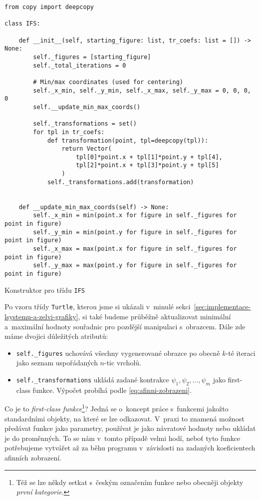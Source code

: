\begin{program}[h]
\begin{lstlisting}[style=python]
from copy import deepcopy

class IFS:

    def __init__(self, starting_figure: list, tr_coefs: list = []) -> None:
        self._figures = [starting_figure]
        self._total_iterations = 0

        # Min/max coordinates (used for centering)
        self._x_min, self._y_min, self._x_max, self._y_max = 0, 0, 0, 0
        self.__update_min_max_coords()

        self._transformations = set()
        for tpl in tr_coefs:
            def transformation(point, tpl=deepcopy(tpl)):
                return Vector(
                    tpl[0]*point.x + tpl[1]*point.y + tpl[4],
                    tpl[2]*point.x + tpl[3]*point.y + tpl[5]
                )
            self._transformations.add(transformation)
    
    
    def __update_min_max_coords(self) -> None:
        self._x_min = min(point.x for figure in self._figures for point in figure)
        self._y_min = min(point.y for figure in self._figures for point in figure)
        self._x_max = max(point.x for figure in self._figures for point in figure)
        self._y_max = max(point.y for figure in self._figures for point in figure)
\end{lstlisting}
    \caption{Konstruktor pro třídu \texttt{IFS}}
    \label{prog:konstruktor-ifs}
\end{program}
Po vzoru třídy \texttt{Turtle}, kterou jsme si ukázali v~minulé sekci~\ref{sec:implementace-lsystemu-a-zelvi-grafiky}, si také budeme průběžně aktualizovat minimální a~maximální hodnoty souřadnic pro pozdější manipulaci s~obrazcem. Dále zde máme dvojici důležitých atributů:
\begin{itemize}
    \item \texttt{self.\_figures} uchovává všechny vygenerované obrazce po obecně $k$-té iteraci jako seznam uspořádaných $n$-tic vrcholů.
    \item \texttt{self.\_transformations} ukládá zadané kontrakce $\psi_1,\psi_2,\ldots,\psi_m$ jako first-class funkce. Výpočet probíhá podle \eqref{eq:afinni-zobrazeni}.
\end{itemize}
Co je to \emph{first-class funkce}\footnote{Též se lze někdy setkat s~českým označením funkce nebo obecněji objekty \emph{první kategorie}.}? Jedná se o~koncept práce s~funkcemi jakožto standardními objekty, na které se lze odkazovat. V~praxi to znamená možnost předávat funkce jako parametry, používat je jako návratové hodnoty nebo ukládat je do proměnných. To se nám v~tomto případě velmi hodí, neboť tyto funkce potřebujeme vytvářet až za běhu programu v~závislosti na zadaných koeficientech afinních zobrazení.

